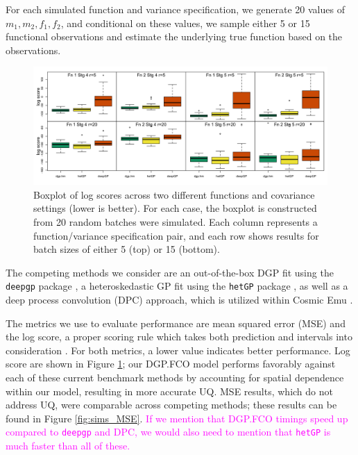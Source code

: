 \documentclass[11pt]{article}
\begin{document}
For each simulated function and variance specification, we generate 20 values of 
$m_1, m_2, f_1, f_2$, and conditional on these values, we sample either 5 or 15 
functional observations and estimate the underlying true function based on the observations.

\begin{figure}[t]
    \centering
    \includegraphics[width=6in]{sims_logS.png}
    \caption{Boxplot of log scores across two different functions and covariance 
             settings (lower is better). For each case, the boxplot is constructed 
             from 20 random batches were simulated. Each column represents a function/variance 
             specification pair, and each row shows results for batch sizes of either 
             5 (top) or 15 (bottom).}
    \label{fig:sims_logS}
\end{figure}

The competing methods we consider are an out-of-the-box DGP fit using the 
\texttt{deepgp} package \citep{sauer2023active}, a heteroskedastic GP fit using 
the \texttt{hetGP} package \citep{binois2018practical, binois2021hetgp}, as well 
as a deep process convolution (DPC) approach, which is utilized within Cosmic 
Emu \citep{moran2023mira}. 

The metrics we use to evaluate performance are mean squared error (MSE) and the 
log score, a proper scoring rule which takes both prediction and intervals into 
consideration \citep{gneiting2007strictly}. For both metrics, a lower value indicates 
better performance. Log score are shown in Figure \ref{fig:sims_logS}; our DGP.FCO 
model performs favorably against each of these current benchmark methods by
accounting for spatial dependence within our model, resulting in more accurate UQ.
MSE results, which do not address UQ, were comparable across competing methods; these results
can be found in Figure \ref{fig:sims_MSE}. \textcolor{magenta}{If we mention that DGP.FCO timings 
speed up compared to \texttt{deepgp} and DPC, we would also need to mention that \texttt{hetGP} 
is much faster than all of these.}
\end{document}
